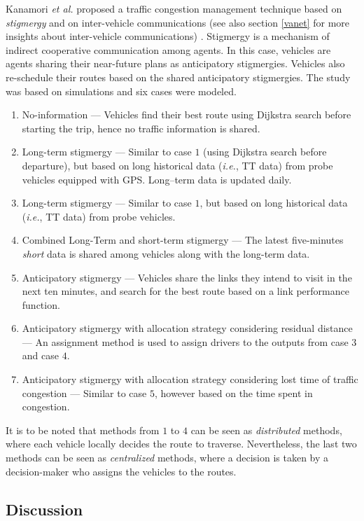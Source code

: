\documentclass[10pt,onecolumn]{article}
\begin{document}
Kanamori \textit{et al.} proposed a traffic congestion management technique based on \textit{stigmergy} and on inter-vehicle communications (see also section \ref{vanet} for more insights about inter-vehicle communications) \cite{kanamori2012}.
Stigmergy is a mechanism of indirect cooperative communication among agents. In this case, vehicles are agents sharing their near-future plans as anticipatory stigmergies. Vehicles also re-schedule their routes based on the shared anticipatory stigmergies.
The study was based on simulations and six cases were modeled.
\begin{enumerate}
 \item {No-information} --- Vehicles find their best route using Dijkstra search before starting the trip, hence no traffic information is shared.
 \item {Long-term stigmergy} --- Similar to case $1$ (using Dijkstra search before departure), but based on long historical data (\textit{i.e.}, TT data) from probe vehicles equipped with GPS. Long--term data is updated daily.
\item {Long-term stigmergy} --- Similar to case $1$, but based on long historical data (\textit{i.e.}, TT data) from probe vehicles.
 \item {Combined Long-Term and short-term stigmergy} --- The latest five-minutes \textit{short} data is shared among vehicles along with the long-term data.
 \item {Anticipatory stigmergy} --- Vehicles share the links they intend to visit in the next ten minutes, and search for the best route based on a link performance function.
 \item {Anticipatory stigmergy with allocation strategy considering residual distance} --- An assignment method is used to assign drivers to the outputs from case $3$ and case $4$.
 \item {Anticipatory stigmergy with allocation strategy considering lost time of traffic congestion} --- Similar to case $5$, however based on the time spent in congestion.
\end{enumerate}
It is to be noted that methods from $1$ to $4$ can be seen as \textit{distributed} methods, where each vehicle locally decides the route to traverse. Nevertheless, the last two methods can be seen as \textit{centralized} methods, where a decision is taken by a decision-maker who assigns the vehicles to the routes.


\subsection{Discussion}
\end{document}
